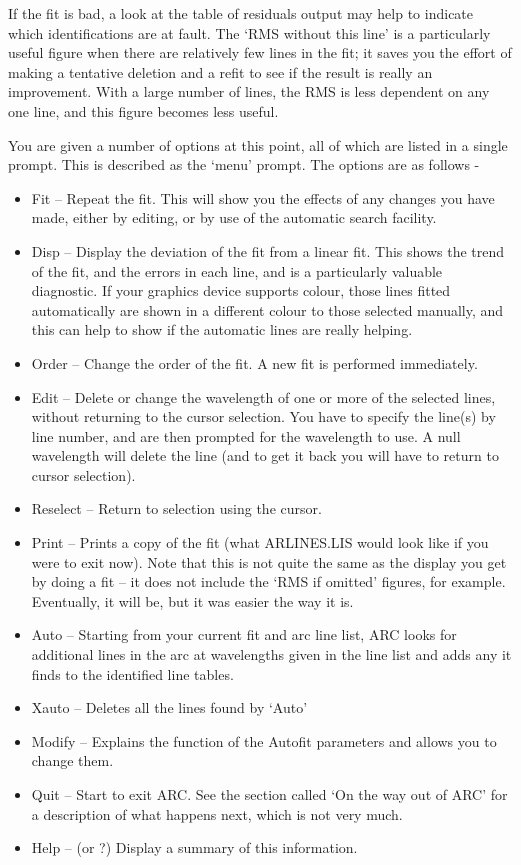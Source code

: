If the fit is bad, a look at
the table of residuals output may help to indicate which identifications
are at fault.   The `RMS without this line' is a particularly useful figure
when there are relatively few lines in the fit; it saves you the effort of
making a tentative deletion and a refit to see if the result is really an
improvement.  With a large number of lines, the RMS is less dependent on any
one line, and this figure becomes less useful.

You are given a number of options at this point, all of which are
listed in a single prompt.  This is described as the `menu' prompt.  The
options are as follows -

\begin{itemize}
\item Fit -- Repeat the fit.  This will show you the effects of any
   changes you have made, either by editing, or by use of the automatic
   search facility.
\item Disp -- Display the deviation of the fit from a linear fit.  This
   shows the trend of the fit, and the errors in each line, and is a
   particularly valuable diagnostic.  If your graphics device supports
   colour, those lines fitted automatically are shown in a different
   colour to those selected manually, and this can help to show if the
   automatic lines are really helping.
\item Order -- Change the order of the fit.  A new fit is performed
   immediately.
\item Edit -- Delete or change the wavelength of one or more of the
   selected lines, without returning to the cursor selection.  You have
   to specify the line(s) by line number, and are then prompted for the
   wavelength to use.  A null wavelength will delete the line (and to
   get it back you will have to return to cursor selection).
\item Reselect -- Return to selection using the cursor.
\item Print -- Prints a copy of the fit (what ARLINES.LIS would look
   like if you were to exit now).  Note that this is not quite the same
   as the display you get by doing a fit -- it does not include the `RMS
   if omitted' figures, for example.  Eventually, it will be, but it was
   easier the way it is.
\item Auto -- Starting from your current fit and arc line list, ARC
   looks for additional lines in the arc at wavelengths given in the
   line list and adds any it finds to the identified line tables.
\item Xauto -- Deletes all the lines found by `Auto'
\item Modify -- Explains the function of the Autofit parameters and
   allows you to change them.
\item Quit -- Start to exit ARC.  See the section called `On the way out
   of ARC' for a description of what happens next, which is not very
   much.
\item Help -- (or ?) Display a summary of this information.
\end{itemize}

